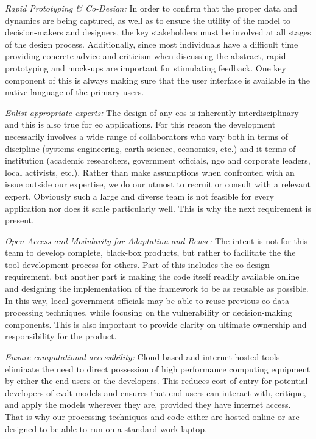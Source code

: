 \textit{Rapid Prototyping \& Co-Design:} In order to confirm that the proper data and dynamics are being captured, as well as to ensure the utility of the model to decision-makers and designers, the key stakeholders must be involved at all stages of the design process. Additionally, since most individuals have a difficult time providing concrete advice and criticism when discussing the abstract, rapid prototyping and mock-ups are important for stimulating feedback. One key component of this is always making sure that the user interface is available in the native language of the primary users.

\textit{Enlist appropriate experts:} The design of any \ac{eos} is inherently interdisciplinary and this is also true for \ac{eo} applications. For this reason the development necessarily involves a wide range of collaborators who vary both in terms of discipline (systems engineering, earth science, economics, etc.) and it terms of institution (academic researchers, government officials, \ac{ngo} and corporate leaders, local activists, etc.). Rather than make assumptions when confronted with an issue outside our expertise, we do our utmost to recruit or consult with a relevant expert. Obviously such a large and diverse team is not feasible for every application nor does it scale particularly well. This is why the next requirement is present.

\textit{Open Access and Modularity for Adaptation and Reuse:} The intent is not for this team to develop complete, black-box products, but rather to facilitate the the tool development process for others. Part of this includes the co-design requirement, but another part is making the code itself readily available online and designing the implementation of the framework to be as reusable as possible. In this way, local government officials may be able to reuse previous \ac{eo} data processing techniques, while focusing on the vulnerability or decision-making components. This is also important to provide clarity on ultimate ownership and responsibility for the product.

\textit{Ensure computational accessibility:} Cloud-based and internet-hosted tools eliminate the need to direct possession of high performance computing equipment by either the end users or the developers. This reduces cost-of-entry for potential developers of \ac{evdt} models and ensures that end users can interact with, critique, and apply the models wherever they are, provided they have internet access. That is why our processing techniques and code either are hosted online or are designed to be able to run on a standard work laptop.

